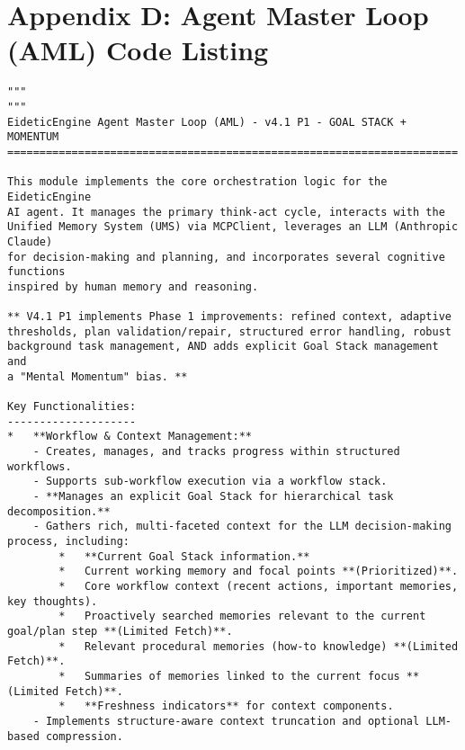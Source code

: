 \documentclass[12pt,a4paper]{article}
\begin{document}
\section{Appendix D: Agent Master Loop (AML) Code Listing}

\label{lst:aml-code} %

\begin{pageablecode}
\begin{verbatim}
"""
"""
EideticEngine Agent Master Loop (AML) - v4.1 P1 - GOAL STACK + MOMENTUM
======================================================================

This module implements the core orchestration logic for the EideticEngine
AI agent. It manages the primary think-act cycle, interacts with the
Unified Memory System (UMS) via MCPClient, leverages an LLM (Anthropic Claude)
for decision-making and planning, and incorporates several cognitive functions
inspired by human memory and reasoning.

** V4.1 P1 implements Phase 1 improvements: refined context, adaptive
thresholds, plan validation/repair, structured error handling, robust
background task management, AND adds explicit Goal Stack management and
a "Mental Momentum" bias. **

Key Functionalities:
--------------------
*   **Workflow & Context Management:**
    - Creates, manages, and tracks progress within structured workflows.
    - Supports sub-workflow execution via a workflow stack.
    - **Manages an explicit Goal Stack for hierarchical task decomposition.**
    - Gathers rich, multi-faceted context for the LLM decision-making process, including:
        *   **Current Goal Stack information.**
        *   Current working memory and focal points **(Prioritized)**.
        *   Core workflow context (recent actions, important memories, key thoughts).
        *   Proactively searched memories relevant to the current goal/plan step **(Limited Fetch)**.
        *   Relevant procedural memories (how-to knowledge) **(Limited Fetch)**.
        *   Summaries of memories linked to the current focus **(Limited Fetch)**.
        *   **Freshness indicators** for context components.
    - Implements structure-aware context truncation and optional LLM-based compression.


\end{verbatim}
\end{pageablecode}
\end{document}
